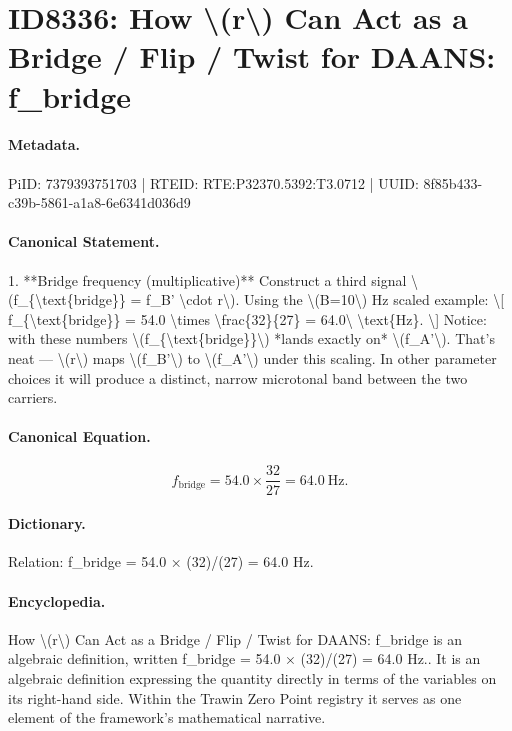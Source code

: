 \section*{ID8336: How \textbackslash{}(r\textbackslash{}) Can Act as a Bridge / Flip / Twist for DAANS: f\_bridge}
\paragraph{Metadata.}
PiID: 7379393751703 | RTEID: RTE:P32370.5392:T3.0712 | UUID: 8f85b433-c39b-5861-a1a8-6e6341d036d9

\paragraph{Canonical Statement.}
1. **Bridge frequency (multiplicative)** Construct a third signal \textbackslash{}(f\_\{\textbackslash{}text\{bridge\}\} = f\_B' \textbackslash{}cdot r\textbackslash{}). Using the \textbackslash{}(B=10\textbackslash{}) Hz scaled example: \textbackslash{}[ f\_\{\textbackslash{}text\{bridge\}\} = 54.0 \textbackslash{}times \textbackslash{}frac\{32\}\{27\} = 64.0\textbackslash{} \textbackslash{}text\{Hz\}. \textbackslash{}] Notice: with these numbers \textbackslash{}(f\_\{\textbackslash{}text\{bridge\}\}\textbackslash{}) *lands exactly on* \textbackslash{}(f\_A'\textbackslash{}). That’s neat — \textbackslash{}(r\textbackslash{}) maps \textbackslash{}(f\_B'\textbackslash{}) to \textbackslash{}(f\_A'\textbackslash{}) under this scaling. In other parameter choices it will produce a distinct, narrow microtonal band between the two carriers.

\paragraph{Canonical Equation.}
\[
f_{\text{bridge}} = 54.0 \times \frac{32}{27} = 64.0\ \text{Hz}.
\]

\paragraph{Dictionary.}
Relation: f\_bridge = 54.0 × (32)/(27) = 64.0 Hz.

\paragraph{Encyclopedia.}
How \textbackslash{}(r\textbackslash{}) Can Act as a Bridge / Flip / Twist for DAANS: f\_bridge is an algebraic definition, written f\_bridge = 54.0 × (32)/(27) = 64.0 Hz.. It is an algebraic definition expressing the quantity directly in terms of the variables on its right-hand side. Within the Trawin Zero Point registry it serves as one element of the framework's mathematical narrative.
